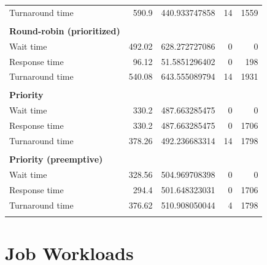 \documentclass[12pt,letterpaper]{article}
\begin{document}
\begin{appendices}
\begin{table}[H]
\begin{tabular}{l r r r r}
Turnaround time &	590.9 &	440.933747858 &	14 &	1559 	\\
					\\
					\textbf{Round-robin (prioritized)} \\
					\hline
					Wait time &		492.02 &	628.272727086 &	0 &	0 	\\
Response time &		96.12 &	51.5851296402 &	0 &	198 	\\
Turnaround time &	540.08 &	643.555089794 &	14 &	1931 	\\
					\\
					\textbf{Priority} \\
					\hline
					Wait time &		330.2 &	487.663285475 &	0 &	0 	\\
Response time &		330.2 &	487.663285475 &	0 &	1706 	\\
Turnaround time &	378.26 &	492.236683314 &	14 &	1798 	\\
					\\
					\textbf{Priority (preemptive)} \\
					\hline
					Wait time &		328.56 &	504.969708398 &	0 &	0 	\\
Response time &		294.4 &	501.648323031 &	0 &	1706 	\\
Turnaround time &	376.62 &	510.908050044 &	4 &	1798 	\\
					\\
				\end{tabular}
			\end{table}
	\section{Job Workloads}
	\end{appendices}

	\clearpage
	\printbibliography
\end{document}
